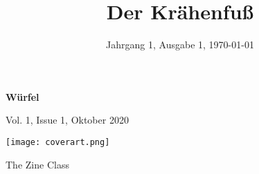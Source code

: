 \documentclass[11pt]{wbzine}
\title{Der Krähenfuß}
\date{Jahrgang 1, Ausgabe 1, \today}
\begin{document}
\maketitle
\tableofcontents

\begin{titlepage}
\centering
{\bfseries\fontsize{70}{55}\selectfont Würfel}

\hrulefill

Vol. 1, Issue 1, Oktober 2020

	  \texttt{[image: coverart.png]}

{\Huge The Zine Class \par}%

\end{titlepage}

\tableofcontents
\end{document}
